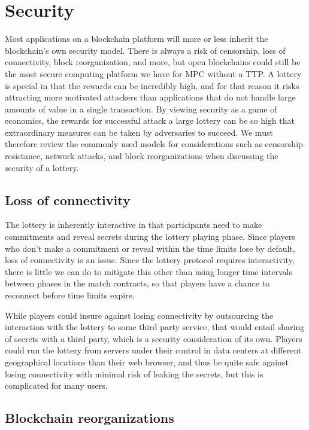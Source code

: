 \section{Security}
\label{sec:security}

Most applications on a blockchain platform will more or less inherit the blockchain's own security model. There is always a risk of censorship, loss of connectivity, block reorganization, and more, but open blockchains could still be the most secure computing platform we have for MPC without a TTP. A lottery is special in that the rewards can be incredibly high, and for that reason it risks attracting more motivated attackers than applications that do not handle large amounts of value in a single transaction. By viewing security as a game of economics, the rewards for successful attack a large lottery can be so high that extraordinary measures can be taken by adversaries to succeed. We must therefore review the commonly used models for considerations such as censorship resistance, network attacks, and block reorganizations when discussing the security of a lottery. 

\subsection{Loss of connectivity}
The lottery is inherently interactive in that participants need to make commitments and reveal secrets during the lottery playing phase. Since players who don't make a commitment or reveal within the time limits lose by default, loss of connectivity is an issue. Since the lottery protocol requires interactivity, there is little we can do to mitigate this other than using longer time intervals between phases in the match contracts, so that players have a chance to reconnect before time limits expire. 

While players could insure against losing connectivity by outsourcing the interaction with the lottery to some third party service, that would entail sharing of secrets with a third party, which is a security consideration of its own. Players could run the lottery from servers under their control in data centers at different geographical locations than their web browser, and thus be quite safe against losing connectivity with minimal risk of leaking the secrets, but this is complicated for many users. 

\subsection{Blockchain reorganizations}

